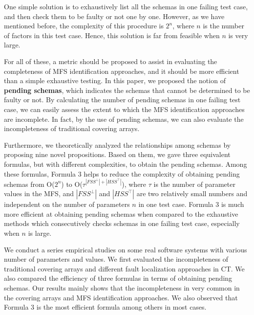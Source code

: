 One simple solution is to exhaustively list all the schemas in one failing test case, and then check them to be faulty or not one by one. However, as we have mentioned before, the complexity of this procedure is $2^{n}$, where $n$ is the number of factors in this test case. Hence, this solution is far from feasible when $n$ is very large.

For all of these, a metric should be proposed to assist in evaluating the completeness of MFS identification approaches, and it should be more efficient than a simple exhaustive testing. In this paper, we proposed the notion of \textbf{pending schemas}, which indicates the schemas that cannot be determined to be faulty or not. By calculating the number of pending schemas in one failing test case, we can easily assess the extent to which the MFS identification approaches are incomplete. In fact, by the use of pending schemas, we can also evaluate the incompleteness of traditional covering arrays.

Furthermore, we theoretically analyzed the relationships among schemas by proposing nine novel propositions. Based on them, we gave three equivalent formulas, but with different complexities, to obtain the pending schemas. Among these formulas, Formula 3 helps to reduce the complexity of obtaining pending schemas from O($2^{n}$) to O($ \tau^{|FSS^{\bot}|+|HSS^{\top}|}$), where $\tau$ is the number of parameter values in the MFS, and $|FSS^{\bot}|$ and $|HSS^{\top}|$ are two relatively small numbers and independent on the number of parameters $n$ in one test case. Formula 3 is much more efficient at obtaining pending schemas when compared to the exhaustive methods which consecutively checks schemas in one failing test case, especially when $n$ is large.


We conduct a series empirical studies on some real software systems with various number of parameters and values. We first evaluated the incompleteness of traditional covering arrays and different fault localization approaches in CT. We also compared the efficiency of three formulas in terms of obtaining pending schemas. Our results mainly shows that the incompleteness in very common in the covering arrays and  MFS identification approaches. We also observed that Formula 3 is the most efficient formula among others in most cases.

